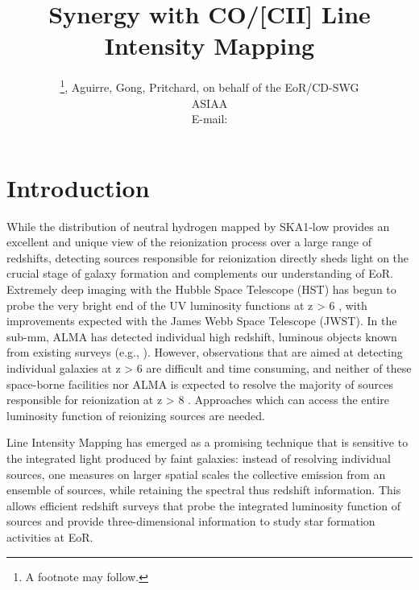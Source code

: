 \documentclass{PoS}
\title{Synergy with CO/[CII] Line Intensity Mapping}
\author{\speaker{Chang}\thanks{A footnote may follow.}, Aguirre, Gong,
  Pritchard,  on behalf of the EoR/CD-SWG\\
        ASIAA\\
        E-mail: \email{tcchang@asiaa.sinica.edu.tw}}
\begin{document}
\section{Introduction}

While the distribution of neutral
hydrogen mapped by SKA1-low provides an excellent and unique view of the reionization
process over a large range of redshifts, detecting sources responsible for
reionization directly sheds light on the crucial stage of galaxy
formation and complements our understanding of EoR.   Extremely deep
imaging with the Hubble Space Telescope (HST) has begun to probe the very bright end of the UV
luminosity functions at z > 6 \cite{2014arXiv1403.4295B, 2013ApJ...768...71R}, with improvements expected 
with the  James Webb Space Telescope (JWST). In the sub-mm, ALMA has
detected individual high redshift, luminous objects known from
existing surveys (e.g., \cite{2013ApJ...778..102O}). However, observations that are aimed at
detecting individual galaxies at z > 6 are difficult and time
consuming, and neither of these space-borne facilities nor ALMA is
expected to resolve the majority of sources responsible for
reionization at z > 8 \cite{2011MNRAS.414..847S}.  Approaches which can access the entire
luminosity function of reionizing sources are needed.

Line Intensity Mapping has emerged as a promising technique that is sensitive
to the integrated light produced by faint galaxies: instead of
resolving individual sources, one measures on larger spatial scales the collective emission
from an ensemble of sources, while retaining the spectral thus redshift
information.  This allows efficient redshift surveys that probe the
integrated luminosity function of sources and provide three-dimensional
information to study star formation activities at EoR. 
\end{document}
